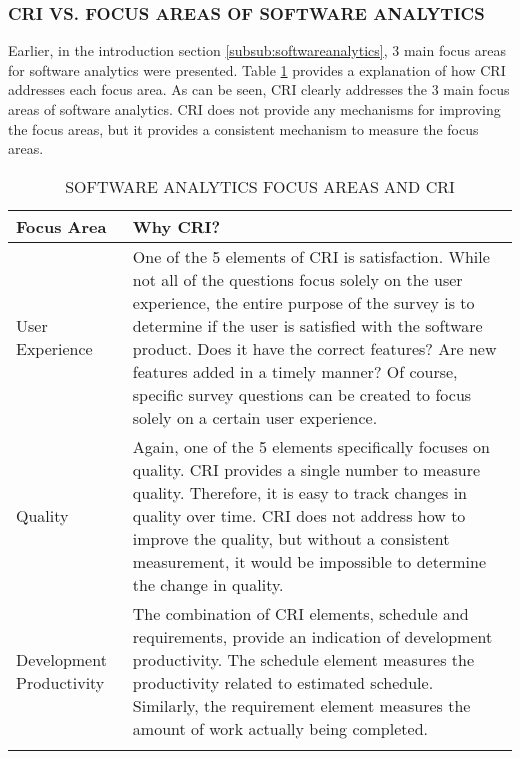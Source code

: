 \documentclass[SDSUThesis.tex]{subfiles}
\begin{document}
        \subsubsection{CRI VS. FOCUS AREAS OF SOFTWARE ANALYTICS}
    
            Earlier, in the introduction section \ref{subsub:softwareanalytics}, 3 main focus 
            areas  for software
            analytics were presented.  Table \ref{tab:focusareas} provides a explanation of how CRI addresses
            each focus area.  
            As can be seen, CRI clearly addresses the 3 main focus areas of software analytics.  CRI does not provide
            any mechanisms for improving the focus areas, but it provides a consistent mechanism to measure
            the focus areas. 
            
            \begin{longtable}{p{3cm}p{11cm}}
                \toprule%
                 \centering%
                 {\bfseries Focus Area}
                 & {\bfseries Why CRI?} \\
                
                \cmidrule[0.4pt](r{0.125em}){1-1}%
                \cmidrule[0.4pt](lr{0.125em}){2-2}%
                \endhead
                
                User Experience & One of the 5 elements of CRI is satisfaction.  While not all of the questions focus solely on the user experience, the entire purpose of the survey is to determine if the user is satisfied
                with the software product. Does it have the correct features? Are new features added in a timely manner? Of course, specific survey questions can be created to focus solely on a certain user experience. \\
                \myrowcolour%
                Quality & Again, one of the 5 elements specifically focuses on quality.  CRI provides a single number
                to measure quality.  Therefore, it is easy to track changes in quality over time.  CRI does not address
                how to improve the quality, but without a consistent measurement, it would be impossible to determine the change in quality. \\
                Development Productivity & The combination of CRI elements, schedule and requirements, provide an 
                indication of development productivity. The schedule element measures the productivity
                related to estimated schedule. Similarly, the requirement element measures the amount of
                work actually being completed.  \\
                
                \bottomrule
                
                \caption{SOFTWARE ANALYTICS FOCUS AREAS AND CRI}
                \label{tab:focusareas}
            \end{longtable}
        
\end{document}
